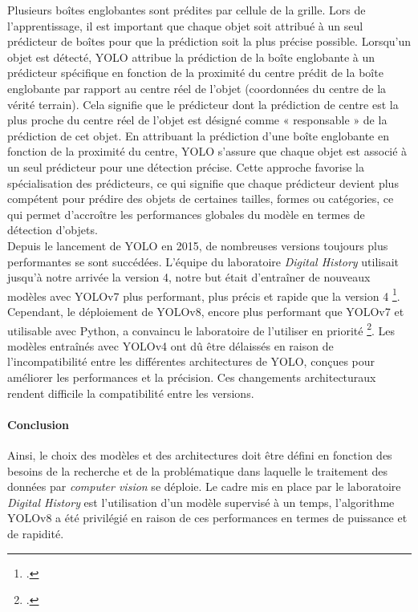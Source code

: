 \documentclass[12pt,twoside]{book}
\begin{document}
Plusieurs boîtes englobantes sont prédites par cellule de la grille. Lors de l'apprentissage, il est important que chaque objet soit attribué à un seul prédicteur de boîtes pour que la prédiction soit la plus précise possible. Lorsqu'un objet est détecté, YOLO attribue la prédiction de la boîte englobante à un prédicteur spécifique en fonction de la proximité du centre prédit de la boîte englobante par rapport au centre réel de l'objet (coordonnées du centre de la vérité terrain). Cela signifie que le prédicteur dont la prédiction de centre est la plus proche du centre réel de l'objet est désigné comme « responsable » de la prédiction de cet objet. En attribuant la prédiction d'une boîte englobante en fonction de la proximité du centre, YOLO s'assure que chaque objet est associé à un seul prédicteur pour une détection précise. Cette approche favorise la spécialisation des prédicteurs, ce qui signifie que chaque prédicteur devient plus compétent pour prédire des objets de certaines tailles, formes ou catégories, ce qui permet d’accroître les performances globales du modèle en termes de détection d’objets. \\

Depuis le lancement de YOLO en 2015, de nombreuses versions toujours plus performantes se sont succédées. L’équipe du laboratoire \textit{Digital History} utilisait jusqu’à notre arrivée la version 4, notre but était d’entraîner de nouveaux modèles avec YOLOv7 plus performant, plus précis et rapide que la version 4 \footcite{redmon_you_2015}. Cependant, le déploiement de YOLOv8, encore plus performant que YOLOv7 et utilisable avec Python, a convaincu le laboratoire de l’utiliser en priorité \footcite{yolov8_ultralytics}. Les modèles entraînés avec YOLOv4 ont dû être délaissés en raison de l’incompatibilité entre les différentes architectures de YOLO, conçues pour améliorer les performances et la précision. Ces changements architecturaux rendent difficile la compatibilité entre les versions. \\

\paragraph{Conclusion}Ainsi, le choix des modèles et des architectures doit être défini en fonction des besoins de la recherche et de la problématique dans laquelle le traitement des données par \textit{computer vision} se déploie. Le cadre mis en place par le laboratoire \textit{Digital History} est l’utilisation d’un modèle supervisé à un temps, l’algorithme YOLOv8 a été privilégié en raison de ces performances en termes de puissance et de rapidité.
\end{document}
